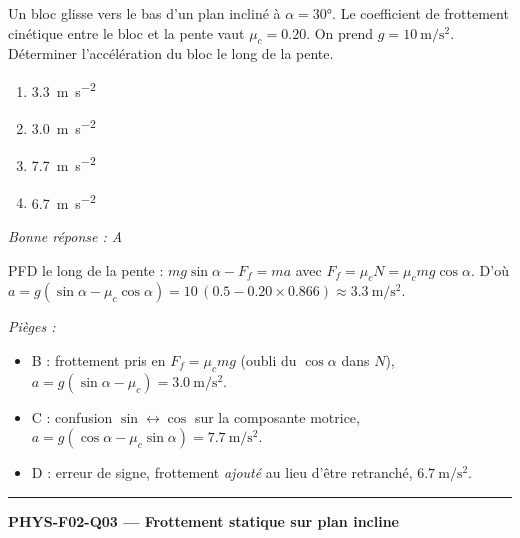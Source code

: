 \documentclass[11pt,a4paper]{article}
\newcommand{\vv}[1]{\vec{#1}}\newcommand{\ds}{\displaystyle}
\begin{document}
Un bloc glisse vers le bas d'un plan incliné à $\alpha=\ang{30}$. Le coefficient de frottement cinétique entre le bloc et la pente vaut $\mu_c=\num{0.20}$. On prend $g=\qty{10}{\metre\per\second\squared}$. Déterminer l'accélération du bloc le long de la pente.
\begin{center}
\end{center}
\begin{enumerate}[label=\Alph*)]
\item \qty{3.3}{\metre\per\second\squared}
\item \qty{3.0}{\metre\per\second\squared}
\item \qty{7.7}{\metre\per\second\squared}
\item \qty{6.7}{\metre\per\second\squared}
\end{enumerate}
\textit{Bonne réponse : A}\par
PFD le long de la pente : $mg\sin\alpha-F_f=ma$ avec $F_f=\mu_c N=\mu_c mg\cos\alpha$. D'où $a=g(\sin\alpha-\mu_c\cos\alpha)=10\,(\num{0.5}-\num{0.20}\times\num{0.866})\approx\qty{3.3}{\metre\per\second\squared}$.\par
\textit{Pièges :}
\begin{itemize}
\item B : frottement pris en $F_f=\mu_c mg$ (oubli du $\cos\alpha$ dans $N$), $a=g(\sin\alpha-\mu_c)=\qty{3.0}{\metre\per\second\squared}$.
\item C : confusion $\sin\leftrightarrow\cos$ sur la composante motrice, $a=g(\cos\alpha-\mu_c\sin\alpha)=\qty{7.7}{\metre\per\second\squared}$.
\item D : erreur de signe, frottement \emph{ajouté} au lieu d'être retranché, $\qty{6.7}{\metre\per\second\squared}$.
\end{itemize}
\vspace{8pt}\hrule\vspace{8pt}
\noindent\textbf{PHYS-F02-Q03 --- Frottement statique sur plan incline}\par
\end{document}
